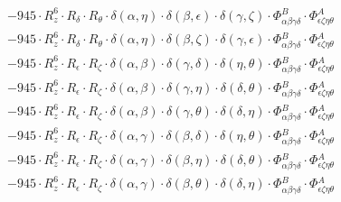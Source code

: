 \documentclass{article}
\begin{document}
\begin{equation}
\begin{array}{c}
 \\[0.2em] 		 - 945 \cdot R_{z}^{6} \cdot R_{\delta{}} \cdot R_{\theta{}} \cdot \delta{}\left(\alpha{}, \eta{}\right) \cdot \delta{}\left(\beta{}, \epsilon{}\right) \cdot \delta{}\left(\gamma{}, \zeta{}\right) \cdot \Phi{}^{B}_{\alpha{}\beta{}\gamma{}\delta{}} \cdot \Phi{}^{A}_{\epsilon{}\zeta{}\eta{}\theta{}} 
 \\[0.2em] 		 - 945 \cdot R_{z}^{6} \cdot R_{\delta{}} \cdot R_{\theta{}} \cdot \delta{}\left(\alpha{}, \eta{}\right) \cdot \delta{}\left(\beta{}, \zeta{}\right) \cdot \delta{}\left(\gamma{}, \epsilon{}\right) \cdot \Phi{}^{B}_{\alpha{}\beta{}\gamma{}\delta{}} \cdot \Phi{}^{A}_{\epsilon{}\zeta{}\eta{}\theta{}} 
 \\[0.2em] 		 - 945 \cdot R_{z}^{6} \cdot R_{\epsilon{}} \cdot R_{\zeta{}} \cdot \delta{}\left(\alpha{}, \beta{}\right) \cdot \delta{}\left(\gamma{}, \delta{}\right) \cdot \delta{}\left(\eta{}, \theta{}\right) \cdot \Phi{}^{B}_{\alpha{}\beta{}\gamma{}\delta{}} \cdot \Phi{}^{A}_{\epsilon{}\zeta{}\eta{}\theta{}} 
 \\[0.2em] 		 - 945 \cdot R_{z}^{6} \cdot R_{\epsilon{}} \cdot R_{\zeta{}} \cdot \delta{}\left(\alpha{}, \beta{}\right) \cdot \delta{}\left(\gamma{}, \eta{}\right) \cdot \delta{}\left(\delta{}, \theta{}\right) \cdot \Phi{}^{B}_{\alpha{}\beta{}\gamma{}\delta{}} \cdot \Phi{}^{A}_{\epsilon{}\zeta{}\eta{}\theta{}} 
 \\[0.2em] 		 - 945 \cdot R_{z}^{6} \cdot R_{\epsilon{}} \cdot R_{\zeta{}} \cdot \delta{}\left(\alpha{}, \beta{}\right) \cdot \delta{}\left(\gamma{}, \theta{}\right) \cdot \delta{}\left(\delta{}, \eta{}\right) \cdot \Phi{}^{B}_{\alpha{}\beta{}\gamma{}\delta{}} \cdot \Phi{}^{A}_{\epsilon{}\zeta{}\eta{}\theta{}} 
 \\[0.2em] 		 - 945 \cdot R_{z}^{6} \cdot R_{\epsilon{}} \cdot R_{\zeta{}} \cdot \delta{}\left(\alpha{}, \gamma{}\right) \cdot \delta{}\left(\beta{}, \delta{}\right) \cdot \delta{}\left(\eta{}, \theta{}\right) \cdot \Phi{}^{B}_{\alpha{}\beta{}\gamma{}\delta{}} \cdot \Phi{}^{A}_{\epsilon{}\zeta{}\eta{}\theta{}} 
 \\[0.2em] 		 - 945 \cdot R_{z}^{6} \cdot R_{\epsilon{}} \cdot R_{\zeta{}} \cdot \delta{}\left(\alpha{}, \gamma{}\right) \cdot \delta{}\left(\beta{}, \eta{}\right) \cdot \delta{}\left(\delta{}, \theta{}\right) \cdot \Phi{}^{B}_{\alpha{}\beta{}\gamma{}\delta{}} \cdot \Phi{}^{A}_{\epsilon{}\zeta{}\eta{}\theta{}} 
 \\[0.2em] 		 - 945 \cdot R_{z}^{6} \cdot R_{\epsilon{}} \cdot R_{\zeta{}} \cdot \delta{}\left(\alpha{}, \gamma{}\right) \cdot \delta{}\left(\beta{}, \theta{}\right) \cdot \delta{}\left(\delta{}, \eta{}\right) \cdot \Phi{}^{B}_{\alpha{}\beta{}\gamma{}\delta{}} \cdot \Phi{}^{A}_{\epsilon{}\zeta{}\eta{}\theta{}} 

\end{array}
\end{equation}
\end{document}
